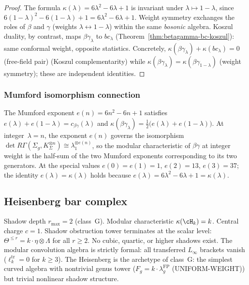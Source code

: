 \begin{proof}
The formula $\kappa(\lambda) = 6\lambda^2 - 6\lambda + 1$ is invariant
under $\lambda \mapsto 1 - \lambda$, since
$6(1{-}\lambda)^2 - 6(1{-}\lambda) + 1
= 6\lambda^2 - 6\lambda + 1$.
Weight symmetry exchanges the roles of $\beta$ and $\gamma$ (weights
$\lambda \leftrightarrow 1{-}\lambda$) within the same
\emph{bosonic} algebra. Koszul duality, by contrast, maps
$\beta\gamma_\lambda$ to $bc_\lambda$
(Theorem~\ref{thm:betagamma-bc-koszul}): same conformal weight, opposite
statistics. Concretely,
$\kappa(\beta\gamma_\lambda) + \kappa(bc_\lambda) = 0$ \textup{(}free-field pair\textup{)}
(Koszul complementarity) while
$\kappa(\beta\gamma_\lambda) = \kappa(\beta\gamma_{1-\lambda})$
(weight symmetry); these are independent identities.\qedhere
\end{proof}

\subsubsection{Mumford isomorphism connection}

\begin{remark}
\label{rem:betagamma-mumford}
The Mumford exponent $e(n) = 6n^2 - 6n + 1$ satisfies
$e(\lambda) + e(1{-}\lambda) = c_{\beta\gamma}(\lambda)$ and
$\kappa(\beta\gamma_\lambda)
= \tfrac{1}{2}\bigl(e(\lambda) + e(1{-}\lambda)\bigr)$.
At integer~$\lambda = n$, the exponent $e(n)$ governs the
isomorphism
$\det R\Gamma(\Sigma_g, K_{\Sigma}^{\otimes n})
\cong \lambda_1^{\otimes e(n)}$,
so the modular characteristic of $\beta\gamma$ at integer weight
is the half-sum of the two Mumford exponents corresponding to
its two generators.
At the special values $e(0) = e(1) = 1$, $e(2) = 13$, $e(3) = 37$;
the identity $e(\lambda) = \kappa(\lambda)$ holds because
$e(\lambda) = 6\lambda^2 - 6\lambda + 1 = \kappa(\lambda)$.
\end{remark}

\subsection{Heisenberg bar complex}\label{sec:heisenberg-bar-complex-sec2}

\begin{remark}
\label{rem:heisenberg-shadow-archetype}
Shadow depth $r_{\max} = 2$ (class~G).
Modular characteristic $\kappa(\cH_k) = k$.
Central charge $c = 1$.
Shadow obstruction tower terminates at the scalar level:
$\Theta^{\leq r} = k \cdot \eta \otimes \Lambda$ for all $r \geq 2$.
No cubic, quartic, or higher shadows exist.
The modular convolution algebra is strictly formal:
all transferred $L_\infty$ brackets vanish ($\ell_k^{\mathrm{tr}} = 0$
for $k \geq 3$).
The Heisenberg is the archetype of class~G: the simplest curved
algebra with nontrivial genus tower ($F_g = k \cdot \lambda_g^{\mathrm{FP}}$
\textup{(}UNIFORM-WEIGHT\textup{)})
but trivial nonlinear shadow structure.
\end{remark}

